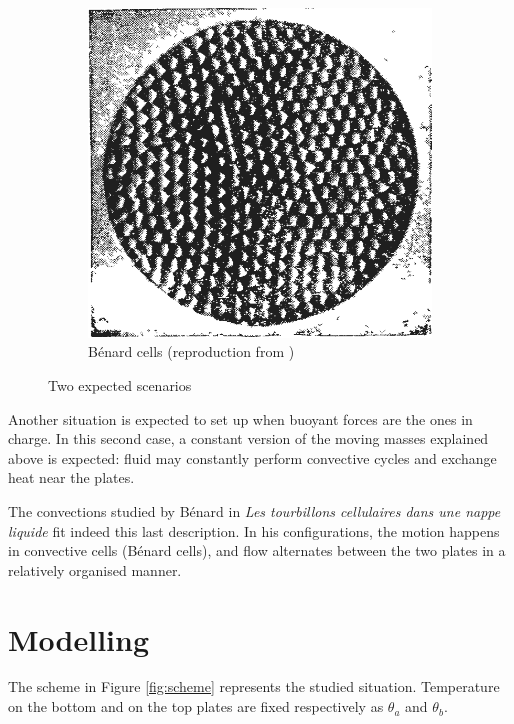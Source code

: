 \documentclass[12pt,oneside]{article}
\begin{document}
\begin{figure}[ht]
\begin{subfigure}[b]{0.4\textwidth}
    \includegraphics[trim=1cm 2cm 1cm 2cm, clip=true, width=\textwidth]{benard}
    \caption{Bénard cells (reproduction from \cite{benard})}
    \label{fig:benard}
  \end{subfigure}
  \caption{Two expected scenarios}\label{fig:scenarios}
\end{figure}

Another situation is expected to set up when buoyant forces are the ones in charge. In this second case, a constant version of the moving masses explained above is expected: fluid may constantly perform convective cycles and exchange heat near the plates.

The convections studied by Bénard in {\it Les tourbillons cellulaires dans une nappe liquide} fit indeed this last description. In his configurations, the motion happens in convective cells (Bénard cells), and flow alternates between the two plates in a relatively organised manner.

\section{Modelling}
The scheme in Figure \ref{fig:scheme} represents the studied situation. Temperature on the bottom and on the top plates are fixed respectively as $\theta_a$ and $\theta_b$.
\end{document}
